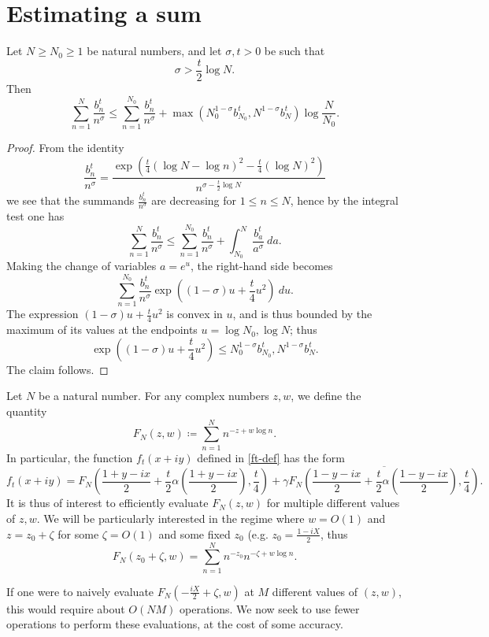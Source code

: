 \section{Estimating a sum}

\begin{lemma}
Let $N \geq N_0 \geq 1$ be natural numbers, and let $\sigma,t > 0$ be such that
$$ \sigma > \frac{t}{2} \log N.$$
Then
$$ \sum_{n=1}^N \frac{b_n^t}{n^\sigma} \leq \sum_{n=1}^{N_0}
\frac{b_n^t}{n^\sigma}  + 
\max( N_0^{1-\sigma} b_{N_0}^t, N^{1-\sigma} b_N^t ) \log \frac{N}{N_0}.$$
\end{lemma}

\begin{proof}  From the identity
$$ \frac{b_n^t}{n^\sigma} = \frac{\exp\left( \frac{t}{4} (\log N - \log n)^2 - \frac{t}{4} (\log N)^2\right) }{n^{\sigma - \frac{t}{2} \log N}}$$
we see that the summands $\frac{b_n^t}{n^\sigma}$ are decreasing for $1 \leq n \leq N$, hence by the integral test one has
$$ \sum_{n=1}^N \frac{b_n^t}{n^\sigma} \leq \sum_{n=1}^{N_0}
\frac{b_n^t}{n^\sigma}  + \int_{N_0}^N \frac{b_a^t}{a^\sigma}\ da.$$
Making the change of variables $a = e^u$, the right-hand side becomes
$$\sum_{n=1}^{N_0} \frac{b_n^t}{n^\sigma} \exp( (1-\sigma) u + \frac{t}{4} u^2 )\ du.$$
The expression $(1-\sigma) u + \frac{t}{4} u^2$ is convex in $u$, and is thus bounded by the maximum of its values at the endpoints $u = \log N_0, \log N$; thus
$$\exp( (1-\sigma) u + \frac{t}{4} u^2) \leq N_0^{1-\sigma} b_{N_0}^t, N^{1-\sigma} b_N^t.$$
The claim follows. 
\end{proof}

Let $N$ be a natural number.  For any complex numbers $z,w$, we define the quantity
$$ F_N(z,w) \coloneqq \sum_{n=1}^N  n^{-z + w \log n}.$$
In particular, the function $f_t(x+iy)$ defined in \eqref{ft-def} has the form
$$ f_t(x+iy) = F_N( \frac{1+y-ix}{2} + \frac{t}{2} \alpha(\frac{1+y-ix}{2}), \frac{t}{4} ) + \gamma \overline{F_N( \frac{1-y-ix}{2} + \frac{t}{2} \alpha(\frac{1-y-ix}{2}), \frac{t}{4} )}.$$
It is thus of interest to efficiently evaluate $F_N(z,w)$ for multiple different values of $z,w$.  We will be particularly interested in the regime where $w=O(1)$ and $z = z_0 + \zeta$ for some $\zeta = O(1)$ and some fixed $z_0$ (e.g. $z_0 = \frac{1-iX}{2}$, thus
$$F_N(z_0+\zeta, w) = \sum_{n=1}^N n^{-z_0} n^{-\zeta + w \log n}.$$

If one were to naively evaluate $F_N(-\frac{iX}{2}+\zeta, w)$ at $M$ different values of $(z,w)$, this would require about $O(NM)$ operations.  We now seek to use fewer operations to perform these evaluations, at the cost of some accuracy.

